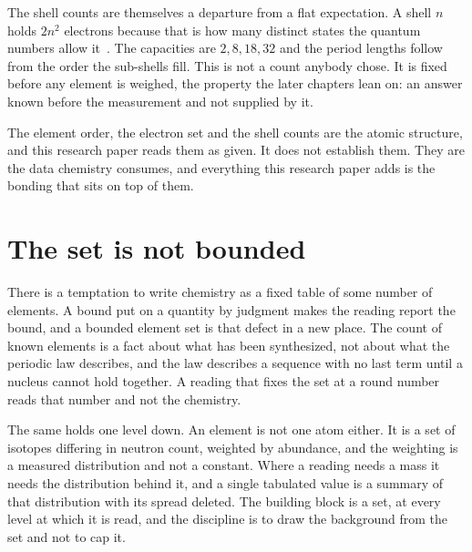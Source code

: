 The shell counts are themselves a departure from a flat expectation. A shell \(n\) holds \(2n^2\)
electrons because that is how many distinct states the quantum numbers allow it~\cite{src:Pauli-1925}. The capacities
are \(2, 8, 18, 32\) and the period lengths follow from the order the sub-shells fill. This is not a
count anybody chose. It is fixed before any element is weighed, the property the later
chapters lean on: an answer known before the measurement and not supplied by it.

The element order, the electron set and the shell counts are the atomic structure, and this research paper
reads them as given. It does not establish them. They are the data chemistry consumes, and
everything this research paper adds is the bonding that sits on top of them.

\section{The set is not bounded}

There is a temptation to write chemistry as a fixed table of some number of elements. A bound put on
a quantity by judgment makes the reading report the bound, and a bounded element set is that defect
in a new place. The count of known elements is a fact about what has been synthesized, not about
what the periodic law describes, and the law describes a sequence with no last term until a nucleus
cannot hold together. A reading that fixes the set at a round number reads that number and not the
chemistry.

The same holds one level down. An element is not one atom either. It is a set of isotopes differing
in neutron count, weighted by abundance, and the weighting is a measured distribution and not a
constant. Where a reading needs a mass it needs the distribution behind it, and a single tabulated
value is a summary of that distribution with its spread deleted. The building block is a set, at
every level at which it is read, and the discipline is to draw the background from the set and not
to cap it.
